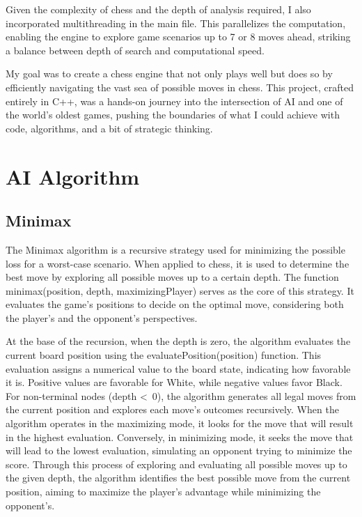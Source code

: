 \documentclass{article}
\begin{document}
Given the complexity of chess and the depth of analysis required, I also incorporated multithreading in the main file. This parallelizes the computation, enabling the engine to explore game scenarios up to 7 or 8 moves ahead, striking a balance between depth of search and computational speed.

My goal was to create a chess engine that not only plays well but does so by efficiently navigating the vast sea of possible moves in chess. This project, crafted entirely in C++, was a hands-on journey into the intersection of AI and one of the world's oldest games, pushing the boundaries of what I could achieve with code, algorithms, and a bit of strategic thinking.
%

\pagebreak

\section{AI Algorithm}
\subsection{Minimax}

The Minimax algorithm is a recursive strategy used for minimizing the possible loss for a worst-case scenario. When applied to chess, it is used to determine the best move by exploring all possible moves up to a certain depth. The function minimax(position, depth, maximizingPlayer) serves as the core of this strategy. It evaluates the game's positions to decide on the optimal move, considering both the player's and the opponent's perspectives.

At the base of the recursion, when the depth is zero, the algorithm evaluates the current board position using the evaluatePosition(position) function. This evaluation assigns a numerical value to the board state, indicating how favorable it is. Positive values are favorable for White, while negative values favor Black. For non-terminal nodes (depth \textless \   0), the algorithm generates all legal moves from the current position and explores each move's outcomes recursively. When the algorithm operates in the maximizing mode, it looks for the move that will result in the highest evaluation. Conversely, in minimizing mode, it seeks the move that will lead to the lowest evaluation, simulating an opponent trying to minimize the score. Through this process of exploring and evaluating all possible moves up to the given depth, the algorithm identifies the best possible move from the current position, aiming to maximize the player's advantage while minimizing the opponent's.
\end{document}
